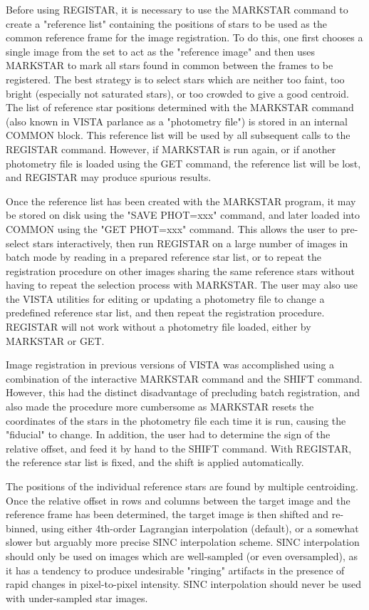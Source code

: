 Before using REGISTAR, it is necessary to use the MARKSTAR command to
create a "reference list" containing the positions of stars to be used as
the common reference frame for the image registration.  To do this, one
first chooses a single image from the set to act as the "reference image"
and then uses MARKSTAR to mark all stars found in common between the frames
to be registered.  The best strategy is to select stars which are neither
too faint, too bright (especially not saturated stars), or too crowded to
give a good centroid.  The list of reference star positions determined with
the MARKSTAR command (also known in VISTA parlance as a "photometry file")
is stored in an internal COMMON block.  This reference list will be used by
all subsequent calls to the REGISTAR command.  However, if MARKSTAR is run
again, or if another photometry file is loaded using the GET command, the
reference list will be lost, and REGISTAR may produce spurious results.

Once the reference list has been created with the MARKSTAR program, it may
be stored on disk using the "SAVE PHOT=xxx" command, and later loaded into
COMMON using the "GET PHOT=xxx" command.  This allows the user to
pre-select stars interactively, then run REGISTAR on a large number of
images in batch mode by reading in a prepared reference star list, or to
repeat the registration procedure on other images sharing the same
reference stars without having to repeat the selection process with
MARKSTAR.  The user may also use the VISTA utilities for editing or
updating a photometry file to change a predefined reference star list, and
then repeat the registration procedure.  REGISTAR will not work without a
photometry file loaded, either by MARKSTAR or GET.

Image registration in previous versions of VISTA was accomplished using a
combination of the interactive MARKSTAR command and the SHIFT command.
However, this had the distinct disadvantage of precluding batch
registration, and also made the procedure more cumbersome as MARKSTAR
resets the coordinates of the stars in the photometry file each time it is
run, causing the "fiducial" to change.  In addition, the user had to
determine the sign of the relative offset, and feed it by hand to the SHIFT
command.  With REGISTAR, the reference star list is fixed, and the shift is
applied automatically.

The positions of the individual reference stars are found by multiple
centroiding.  Once the relative offset in rows and columns between the
target image and the reference frame has been determined, the target image
is then shifted and re-binned, using either 4th-order Lagrangian
interpolation (default), or a somewhat slower but arguably more precise
SINC interpolation scheme.  SINC interpolation should only be used on
images which are well-sampled (or even oversampled), as it has a tendency
to produce undesirable "ringing" artifacts in the presence of rapid changes
in pixel-to-pixel intensity.  SINC interpolation should never be used with
under-sampled star images.

